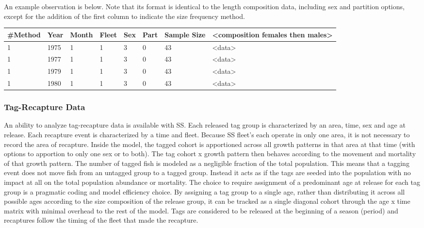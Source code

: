 An example observation is below.  Note that its format is identical to the length composition data, including sex and partition options, except for the addition of the first column to indicate the size frequency method.

\begin{center}
	\begin{tabular}{p{1.5cm} p{1cm} p{1cm} p{1cm} p{1cm} p{1cm} p{1cm} p{6cm}}
		\hline
		\#Method & Year & Month & Fleet & Sex & Part & Sample Size & <composition females then males>\\
		\hline
		1 & 1975 & 1 & 1 & 3 & 0 & 43 & <data> \\
		1 & 1977 & 1 & 1 & 3 & 0 & 43 & <data> \\
		1 & 1979 & 1 & 1 & 3 & 0 & 43 & <data> \\
		1 & 1980 & 1 & 1 & 3 & 0 & 43 & <data> \\
		\hline
	\end{tabular}
\end{center}

\subsubsection{Tag-Recapture Data}
An ability to analyze tag-recapture data is available with SS.  Each released tag group is characterized by an area, time, sex and age at release.  Each recapture event is characterized by a time and fleet.  Because SS fleet’s each operate in only one area, it is not necessary to record the area of recapture.  Inside the model, the tagged cohort is apportioned across all growth patterns in that area at that time (with options to apportion to only one sex or to both).  The tag cohort x growth pattern then behaves according to the movement and mortality of that growth pattern.  The number of tagged fish is modeled as a negligible fraction of the total population.  This means that a tagging event does not move fish from an untagged group to a tagged group.  Instead it acts as if the tags are seeded into the population with no impact at all on the total population abundance or mortality.  The choice to require assignment of a predominant age at release for each tag group is a pragmatic coding and model efficiency choice.  By assigning a tag group to a single age, rather than distributing it across all possible ages according to the size composition of the release group, it can be tracked as a single diagonal cohort through the age x time matrix with minimal overhead to the rest of the model.  Tags are considered to be released at the beginning of a season (period) and recaptures follow the timing of the fleet that made the recapture.

